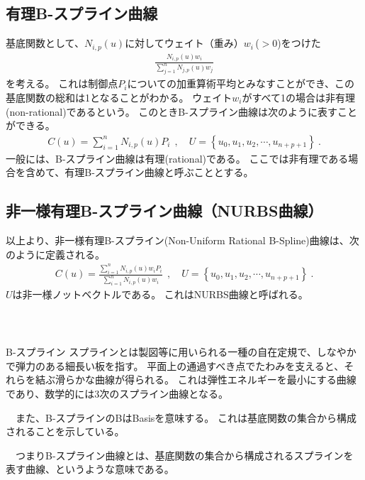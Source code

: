 \subsection{有理B-スプライン曲線}
基底関数として、$N_{i, p}(u)$に対してウェイト（重み）$w_i$\,($>0$)をつけた
\begin{align*}
  \frac{N_{i, p}(u)w_i}{\displaystyle\sum_{j=1}^nN_{j, p}(u)w_j}
\end{align*}
を考える。
これは制御点$P_i$についての加重算術平均とみなすことができ、この基底関数の総和は1となることがわかる。
ウェイト$w_i$がすべて1の場合は非有理(non-rational)であるという。
このときB-スプライン曲線は次のように表すことができる。
\begin{align*}
  C(u) = \sum_{i=1}^nN_{i, p}(u)P_i~~, \quad
  U = \left\{u_0, u_1, u_2, \cdots, u_{n+p+1}\right\}\ .
\end{align*}
一般には、B-スプライン曲線は有理(rational)である。
ここでは非有理である場合を含めて、有理B-スプライン曲線と呼ぶこととする。


\subsection{非一様有理B-スプライン曲線（NURBS曲線）}
以上より、非一様有理B-スプライン(Non-Uniform Rational B-Spline)曲線は、次のように定義される。
\begin{align*}
  C(u) = \frac{\displaystyle\sum_{i=1}^nN_{i, p}(u)w_iP_i}{\displaystyle\sum_{i=1}^nN_{i, p}(u)w_i}~~,\quad
  U = \left\{u_0, u_1, u_2, \cdots, u_{n+p+1}\right\}\ .
\end{align*}
$U$は非一様ノットベクトルである。
これはNURBS曲線と呼ばれる。

~\vfill
\begin{Column}{B-スプライン}
スプラインとは製図等に用いられる一種の自在定規で、しなやかで弾力のある細長い板を指す。
平面上の通過すべき点でたわみを支えると、それらを結ぶ滑らかな曲線が得られる。
これは弾性エネルギーを最小にする曲線であり、数学的には3次のスプライン曲線となる。

　また、B-スプラインのBはBasisを意味する。
これは基底関数の集合から構成されることを示している。

　つまりB-スプライン曲線とは、基底関数の集合から構成されるスプラインを表す曲線、というような意味である。
\end{Column}



